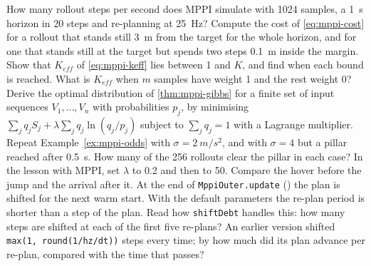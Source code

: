 \begin{exercises}
\exercise[1] How many rollout steps per second does MPPI simulate with 1024 samples, a \SI{1}{s} horizon in 20 steps and re-planning at \SI{25}{Hz}?
\exercise[1] Compute the cost of \cref{eq:mppi-cost} for a rollout that stands still \SI{3}{m} from the target for the whole horizon, and for one that stands still at the target but spends two steps \SI{0.1}{m} inside the margin.
\exercise[2] Show that $K_{eff}$ of \cref{eq:mppi-keff} lies between 1 and $K$, and find when each bound is reached. What is $K_{eff}$ when $m$ samples have weight 1 and the rest weight 0?
\exercise[2] Derive the optimal distribution of \cref{thm:mppi-gibbs} for a finite set of input sequences $V_1, \dots, V_n$ with probabilities $p_j$, by minimising $\sum_j q_jS_j + \lambda\sum_j q_j\ln(q_j/p_j)$ subject to $\sum_j q_j = 1$ with a Lagrange multiplier.
\exercise[2]\label{ex:mppi-sigma} Repeat Example~\ref{ex:mppi-odds} with $\sigma = \SI{2}{m/s^2}$, and with $\sigma = 4$ but a pillar reached after \SI{0.5}{s}. How many of the 256 rollouts clear the pillar in each case?
\exercise[2] In the lesson with MPPI, set $\lambda$ to 0.2 and then to 50. Compare the hover before the jump and the arrival after it.
\exercise[2] At the end of \texttt{MppiOuter.update} () the plan is shifted for the next warm start. With the default parameters the re-plan period is shorter than a step of the plan. Read how \texttt{shiftDebt} handles this: how many steps are shifted at each of the first five re-plans? An earlier version shifted \texttt{max(1, round(1/hz/dt))} steps every time; by how much did its plan advance per re-plan, compared with the time that passes?

\end{exercises}
